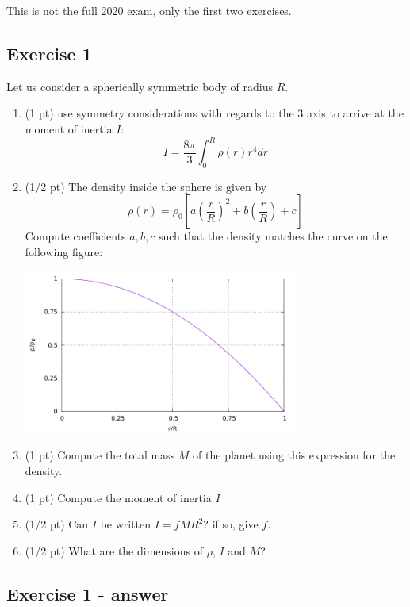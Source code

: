 This is not the full 2020 exam, only the first two exercises. 

\subsection*{Exercise 1}
Let us consider a spherically symmetric body of radius $R$.

\begin{enumerate}
\item (1 pt) use symmetry considerations with regards to the 3 axis
to arrive at the moment of inertia $I$:
\begin{equation}
I=\frac{8\pi}{3} \int_0^R \rho(r) r^4 dr 
\end{equation}
\item (1/2 pt) The density inside the sphere is given by
\[
\rho(r)=\rho_0 \left[ a \left(\frac{r}{R}\right)^2+ b \left(\frac{r}{R}\right) + c \right]
\]
Compute coefficients $a,b,c$ such that the density matches the curve on the following figure:

\begin{center}
\includegraphics[width=9cm]{images/gravity/exam2020/rho.pdf}
\end{center}

\item (1 pt) Compute the total mass $M$ of the planet using this expression for the density.
\item (1 pt) Compute the moment of inertia $I$
\item (1/2 pt) Can $I$ be written $I=fMR^2$? if so, give $f$.
\item (1/2 pt) What are the dimensions of $\rho$, $I$ and $M$?
\end{enumerate}

\subsection*{Exercise 1 - answer}

